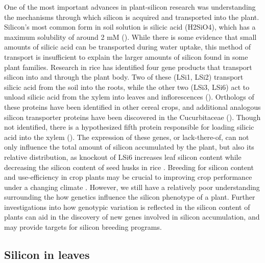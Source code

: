 \documentclass[12pt, letterpaper, ]{article}
\begin{document}
One of the most important advances in plant-silicon research was understanding the mechanisms through which silicon is acquired and transported into the plant. Silicon’s most common form in soil solution is silicic acid (H2SiO4), which has a maximum solubility of around 2 mM (\cite{haynes_contemporary_2014}). While there is some evidence that small amounts of silicic acid can be transported during water uptake, this method of transport is insufficient to explain the larger amounts of silicon found in some plant families. Research in rice has identified four gene products that transport silicon into and through the plant body. Two of these (LSi1, LSi2) transport silicic acid from the soil into the roots, while the other two (LSi3, LSi6) act to unload silicic acid from the xylem into leaves and inflorescences (\cite{yamaji_orchestration_2015}). Orthologs of these proteins have been identified in other cereal crops, and additional analogous silicon transporter proteins have been discovered in the Cucurbitaceae (\cite{reynolds_silicon_2016}). Though not identified, there is a hypothesized fifth protein responsible for loading silicic acid into the xylem (\cite{farooq_silicon_2015}). The expression of these genes, or lack-there-of, can not only influence the total amount of silicon accumulated by the plant, but also its relative distribution, as knockout of LSi6 increases leaf silicon content while decreasing the silicon content of seed husks in rice \cite{yamaji_transporter_2008}. Breeding for silicon content and use-efficiency in crop plants may be crucial to improving crop performance under a changing climate \cite{christian_breeding_2022}. However, we still have a relatively poor understanding surrounding the how genetics influence the silicon phenotype of a plant. Further investigations into how genotypic variation is reflected in the silicon content of plants can aid in the discovery of new genes involved in silicon accumulation, and may provide targets for silicon breeding programs. 

\subsection{Silicon in leaves}	
\end{document}
